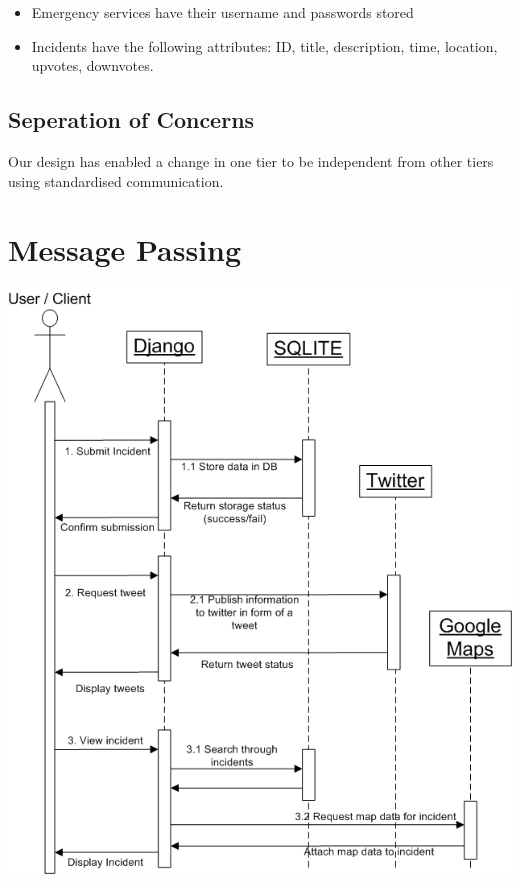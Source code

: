 \documentclass{sig-alt-release2}
\begin{document}
\begin{itemize}
\item    Emergency services have their username and passwords stored
\item Incidents have the following attributes: ID, title, description, time, location, upvotes, downvotes.
\end{itemize}

\subsection{Seperation of Concerns}

Our design has enabled a change in one tier to be independent from other tiers using standardised communication.

\newpage
\section{Message Passing}

\includegraphics[scale=0.3]{img/3.png}
\end{document}
